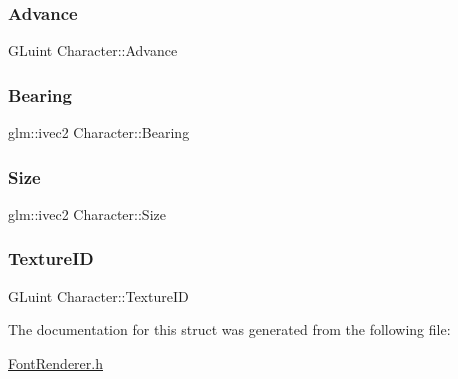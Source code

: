 \subsubsection{\texorpdfstring{Advance}{Advance}}
{\footnotesize\ttfamily G\+Luint Character\+::\+Advance}

\mbox{\label{struct_character_afef98bf9c7f5313d96476f6f3f85f872}} 
\subsubsection{\texorpdfstring{Bearing}{Bearing}}
{\footnotesize\ttfamily glm\+::ivec2 Character\+::\+Bearing}

\mbox{\label{struct_character_aaaa598050e0ef590fe6903fd2bab40b8}} 
\subsubsection{\texorpdfstring{Size}{Size}}
{\footnotesize\ttfamily glm\+::ivec2 Character\+::\+Size}

\mbox{\label{struct_character_a51d894cc31d79e95fe1a47fb65c6e889}} 
\subsubsection{\texorpdfstring{Texture\+ID}{TextureID}}
{\footnotesize\ttfamily G\+Luint Character\+::\+Texture\+ID}



The documentation for this struct was generated from the following file\+:\begin{DoxyCompactItemize}
\item 
\mbox{\hyperlink{_font_renderer_8h}{Font\+Renderer.\+h}}\end{DoxyCompactItemize}
